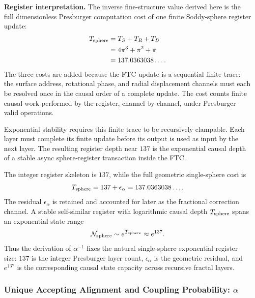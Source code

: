 \documentclass[11pt,a4paper]{article}
\begin{document}
\begin{samepage}
\begin{mdframed}[
  linewidth=0.8pt,
  linecolor=black,
  topline=true,
  bottomline=true,
  leftline=true,
  rightline=true,
  innerleftmargin=10pt,
  innerrightmargin=10pt,
  innertopmargin=8pt,
  innerbottommargin=8pt,
  skipabove=10pt,
  skipbelow=10pt
]
\textbf{Register interpretation.}
The inverse fine-structure value derived here is the full dimensionless Presburger computation cost of one finite Soddy-sphere register update:
\begin{align*}
T_{\rm sphere}
&= T_S+T_R+T_D \\
&=4\pi^3+\pi^2+\pi \\
&=137.0363038\ldots .
\end{align*}
The three costs are added because the FTC update is a sequential finite trace: the surface address, rotational phase, and radial displacement channels must each be resolved once in the causal order of a complete update. The cost counts finite causal work performed by the register, channel by channel, under Presburger-valid operations.

Exponential stability requires this finite trace to be recursively clampable. Each layer must complete its finite update before its output is used as input by the next layer. The resulting register depth near \(137\) is the exponential causal depth of a stable async sphere-register transaction inside the FTC.

The integer register skeleton is \(137\), while the full geometric single-sphere cost is
\[
T_{\rm sphere}=137+\epsilon_\alpha=137.0363038\ldots .
\]
The residual \(\epsilon_\alpha\) is retained and accounted for later as the fractional correction channel. A stable self-similar register with logarithmic causal depth \(T_{\rm sphere}\) spans an exponential state range
\[
\mathcal{N}_{\rm sphere}\sim e^{T_{\rm sphere}}\approx e^{137}.
\]
Thus the derivation of \(\alpha^{-1}\) fixes the natural single-sphere exponential register size: \(137\) is the integer Presburger layer count, \(\epsilon_\alpha\) is the geometric residual, and \(e^{137}\) is the corresponding causal state capacity across recursive fractal layers.
\end{mdframed}
\end{samepage}

\subsubsection{Unique Accepting Alignment and Coupling Probability: $\alpha$}
\label{sec:alpha_deriv}
\end{document}
